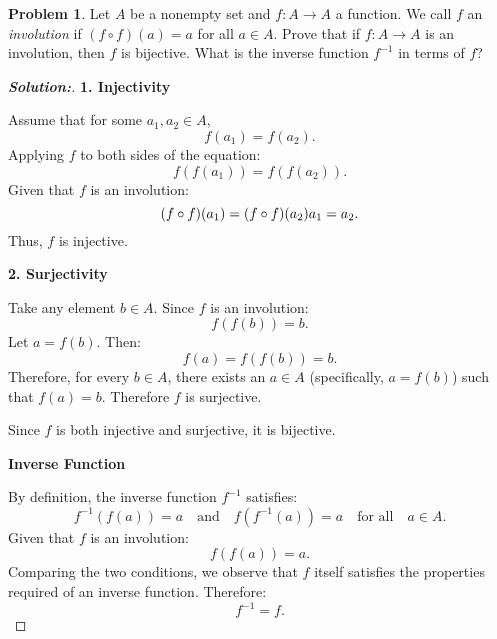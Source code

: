\documentclass[12pt]{article}
\theoremstyle{definition}\newtheorem{problem}{Problem}
\newenvironment{solution}{\begin{proof}[\bfseries\textup{Solution:}]}{\end{proof}}
\begin{document}
\newpage
\begin{problem}
Let $A$ be a nonempty set and $f:A\to A$ a function.  We call $f$ an \emph{involution} if $(f\circ f)(a) = a$ for all $a\in A$.  Prove that if $f:A\to A$ is an involution, then $f$ is bijective.  What is the inverse function $f^{-1}$ in terms of $f$?
\end{problem}
\begin{solution}
    \textbf{1. Injectivity}
    
    Assume that for some \( a_1, a_2 \in A \),
    $$
    f(a_1) = f(a_2).
    $$
    Applying \( f \) to both sides of the equation:
    $$
    f(f(a_1)) = f(f(a_2)).
    $$
    Given that \( f \) is an involution:
    $$
    (f \circ f)(a_1) = (f \circ f)(a_2) \\
    a_1 = a_2.
    $$
    Thus, \( f \) is injective.
    
    \textbf{2. Surjectivity}
    
    Take any element \( b \in A \). Since \( f \) is an involution:
    $$
    f(f(b)) = b.
    $$
    Let \( a = f(b) \). Then:
    $$
    f(a) = f(f(b)) = b.
    $$
    Therefore, for every \( b \in A \), there exists an \( a \in A \) (specifically, \( a = f(b) \)) such that \( f(a) = b \). Therefore \( f \) is surjective.
    
    Since \( f \) is both injective and surjective, it is bijective.
    
    \textbf{Inverse Function}
    
    By definition, the inverse function \( f^{-1} \) satisfies:
    $$
    f^{-1}(f(a)) = a \quad \text{and} \quad f(f^{-1}(a)) = a \quad \text{for all} \quad a \in A.
    $$
    Given that \( f \) is an involution:
    $$
    f(f(a)) = a.
    $$
    Comparing the two conditions, we observe that \( f \) itself satisfies the properties required of an inverse function. Therefore:
    $$
    f^{-1} = f.
    $$
    
    
\end{solution}
\end{document}
